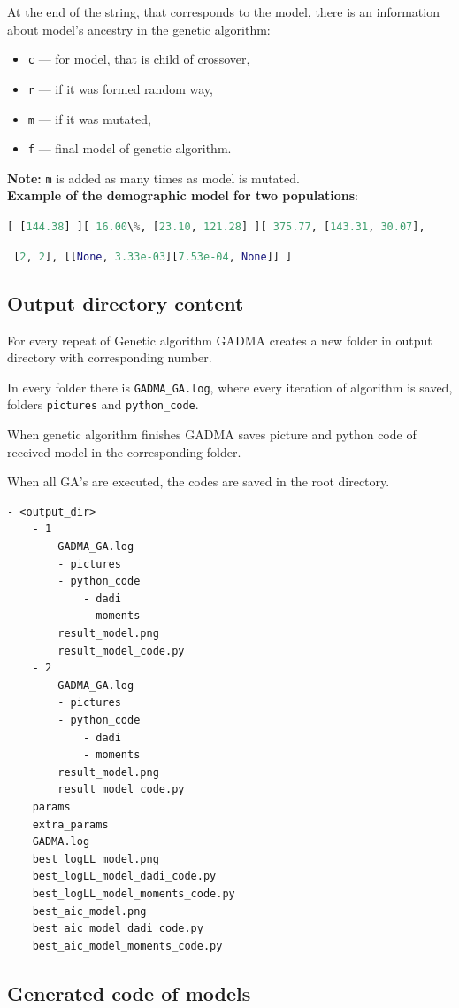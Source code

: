 \documentclass[12pt]{article}
\makeatletter
\newcommand{\py}[1]{\lstinline[language=Python, showstringspaces=False]@#1@}
\makeatother
\begin{document}
At the end of the string, that corresponds to the model, there is an information about model's ancestry in the genetic algorithm: 
\begin{itemize}
    \item \py{c} --- for model, that is child of crossover,
    \item \py{r} --- if it was formed random way,
    \item \py{m} --- if it was mutated,
    \item \py{f} --- final model of genetic algorithm.
\end{itemize}

\textbf{Note:} \py{m} is added as many times as model is mutated.\\

\textbf{Example of the demographic model for two populations}:

\py{[ [144.38] ][ 16.00\%, [23.10, 121.28] ][ 375.77, [143.31, 30.07],}

\hspace{6cm} \py{ [2, 2], [[None, 3.33e-03][7.53e-04, None]] ]}


\subsection{Output directory content}

For every repeat of Genetic algorithm GADMA creates a new folder in output directory with corresponding number.

In every folder there is \py{GADMA_GA.log}, where every iteration of algorithm is saved, folders \py{pictures} and \py{python_code}.

When genetic algorithm finishes GADMA saves picture and python code of received model in the corresponding folder.

When all GA's are executed, the codes are saved in the root directory.
\begin{lstlisting}
- <output_dir>
	- 1
		GADMA_GA.log
		- pictures
		- python_code
			- dadi
			- moments
		result_model.png
		result_model_code.py
	- 2
		GADMA_GA.log
		- pictures
		- python_code
			- dadi
			- moments
		result_model.png
		result_model_code.py
	params
	extra_params
	GADMA.log
	best_logLL_model.png
	best_logLL_model_dadi_code.py
	best_logLL_model_moments_code.py
	best_aic_model.png
	best_aic_model_dadi_code.py
	best_aic_model_moments_code.py
\end{lstlisting}

\subsection{Generated code of models}
\end{document}
